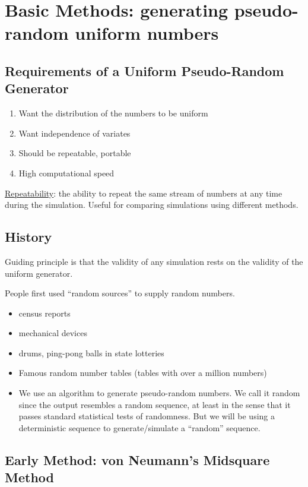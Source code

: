 \documentclass[captions=tableheading]{scrbook}
\begin{document}
\section{Basic Methods: generating pseudo-random uniform numbers}
\label{sec-2_1}
\subsection{Requirements of a Uniform Pseudo-Random Generator}
\label{sec-2_1_1}


\begin{enumerate}
\item Want the distribution of the numbers to be uniform
\item Want independence of variates
\item Should be repeatable, portable
\item High computational speed
\end{enumerate}

\underline{Repeatability}: the ability to repeat the same stream of numbers at any time during the simulation. Useful for comparing simulations using different methods.
\subsection{History}
\label{sec-2_1_2}

Guiding principle is that the validity of any simulation rests on the validity of the uniform generator.

People first used ``random sources'' to supply random numbers.

\begin{itemize}
\item census reports
\item mechanical devices
\item drums, ping-pong balls in state lotteries
\item Famous random number tables (tables with over a million numbers)
\item We use an algorithm to generate pseudo-random numbers. We call it random since the output resembles a random sequence, at least in the sense that it passes standard statistical tests of randomness. But we will be using a deterministic sequence to generate/simulate a ``random'' sequence.
\end{itemize}
\subsection{Early Method: von Neumann's Midsquare Method}
\label{sec-2_1_3}
\end{document}
